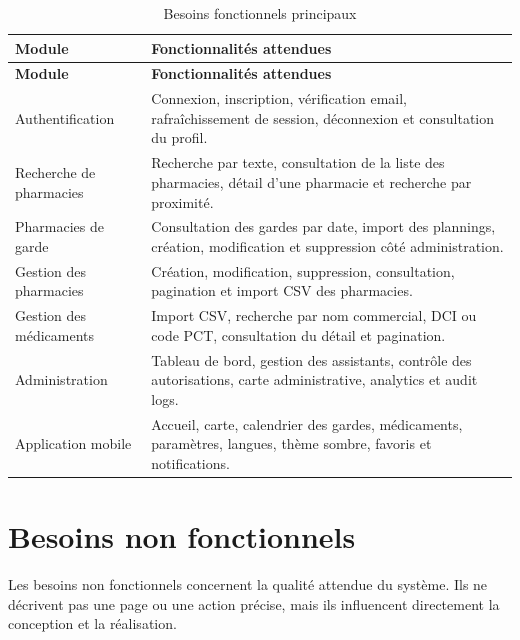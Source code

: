 \begin{longtable}{L{4cm}L{10cm}}
    \caption{Besoins fonctionnels principaux}\\
    \toprule
    \textbf{Module} & \textbf{Fonctionnalités attendues} \\
    \midrule
    \endfirsthead
    \toprule
    \textbf{Module} & \textbf{Fonctionnalités attendues} \\
    \midrule
    \endhead
    Authentification & Connexion, inscription, vérification email, rafraîchissement de session, déconnexion et consultation du profil. \\
    Recherche de pharmacies & Recherche par texte, consultation de la liste des pharmacies, détail d'une pharmacie et recherche par proximité. \\
    Pharmacies de garde & Consultation des gardes par date, import des plannings, création, modification et suppression côté administration. \\
    Gestion des pharmacies & Création, modification, suppression, consultation, pagination et import CSV des pharmacies. \\
    Gestion des médicaments & Import CSV, recherche par nom commercial, DCI ou code PCT, consultation du détail et pagination. \\
    Administration & Tableau de bord, gestion des assistants, contrôle des autorisations, carte administrative, analytics et audit logs. \\
    Application mobile & Accueil, carte, calendrier des gardes, médicaments, paramètres, langues, thème sombre, favoris et notifications. \\
    \bottomrule
\end{longtable}

\section{Besoins non fonctionnels}

Les besoins non fonctionnels concernent la qualité attendue du système. Ils ne décrivent pas une page ou
une action précise, mais ils influencent directement la conception et la réalisation.

